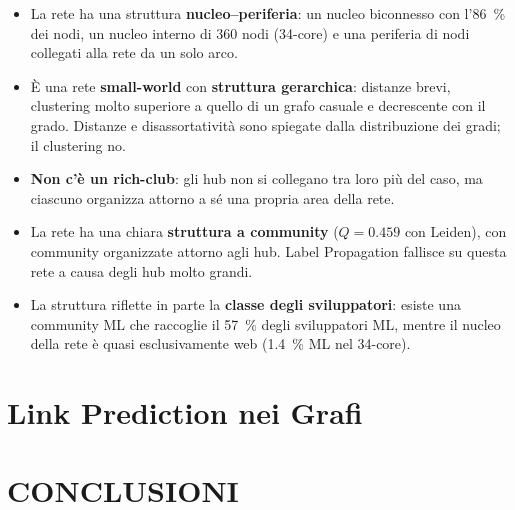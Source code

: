 \documentclass[11pt]{report}
\begin{document}
\begin{itemize}
  \item La rete ha una struttura \textbf{nucleo--periferia}: un nucleo biconnesso
        con l'\SI{86}{\percent} dei nodi, un nucleo interno di 360 nodi
        (34-core) e una periferia di nodi collegati alla rete da un solo arco.
  \item È una rete \textbf{small-world} con \textbf{struttura gerarchica}: distanze
        brevi, clustering molto superiore a quello di un grafo casuale e decrescente
        con il grado. Distanze e disassortatività sono spiegate dalla distribuzione
        dei gradi; il clustering no.
  \item \textbf{Non c'è un rich-club}: gli hub non si collegano tra loro più del
        caso, ma ciascuno organizza attorno a sé una propria area della rete.
  \item La rete ha una chiara \textbf{struttura a community}
        ($Q=\num{0.459}$ con Leiden), con community organizzate attorno agli hub.
        Label Propagation fallisce su questa rete a causa degli hub molto grandi.
  \item La struttura riflette in parte la \textbf{classe degli sviluppatori}: esiste
        una community ML che raccoglie il \SI{57}{\percent} degli sviluppatori ML,
        mentre il nucleo della rete è quasi esclusivamente web
        (\SI{1.4}{\percent} ML nel 34-core).
\end{itemize}

\chapter{Link Prediction nei Grafi}
\label{cap:link_prediction}


\chapter{CONCLUSIONI}



\end{document}
